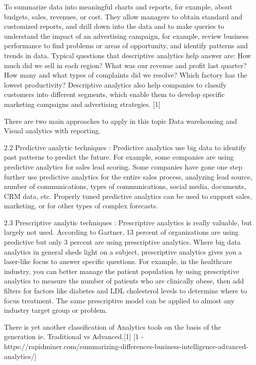 To summarize data into meaningful charts and reports, for example, about budgets, sales, revenues, or cost. They allow managers to obtain standard and customized reports, and drill down into the data and to make queries to understand the impact of an advertising campaign, for example, review business performance to find problems or areas of opportunity, and identify patterns and trends in data. Typical questions that descriptive analytics help answer are: How much did we sell in each region? What was our revenue and profit last quarter? How many and what types of complaints did we resolve? Which factory has the lowest productivity? Descriptive analytics also help companies to classify customers into different segments, which enable them to develop specific marketing campaigns and advertising strategies. [1]

There are two main approaches to apply in this topic Data warehousing and Visual analytics with reporting.

2.2 Predictive analytic techniques : Predictive analytics use big data to identify past patterns to predict the future. For example, some companies are using predictive analytics for sales lead scoring. Some companies have gone one step further use predictive analytics for the entire sales process, analyzing lead source, number of communications, types of communications, social media, documents, CRM data, etc. Properly tuned predictive analytics can be used to support sales, marketing, or for other types of complex forecasts.


2.3 Prescriptive analytic techniques : Prescriptive analytics is really valuable, but largely not used. According to Gartner, 13 percent of organizations are using predictive but only 3 percent are using prescriptive analytics. Where big data analytics in general sheds light on a subject, prescriptive analytics gives you a laser-like focus to answer specific questions. For example, in the healthcare industry, you can better manage the patient population by using prescriptive analytics to measure the number of patients who are clinically obese, then add filters for factors like diabetes and LDL cholesterol levels to determine where to focus treatment. The same prescriptive model can be applied to almost any industry target group or problem.


There is yet another classification of Analytics tools on the basis of the generation ie. Traditional vs Advanced.[1] [1 - https://rapidminer.com/summarizing-differences-business-intelligence-advanced-analytics/]

